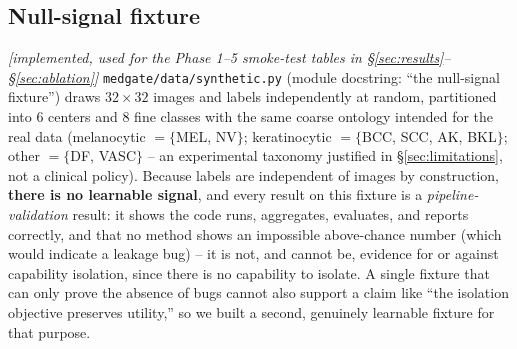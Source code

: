 \documentclass[11pt]{article}
\newcommand{\status}[1]{\textit{[#1]}}
\begin{document}
\subsection{Null-signal fixture} \status{implemented, used for the Phase 1--5
smoke-test tables in \S\ref{sec:results}--\S\ref{sec:ablation}}
\label{sec:synthetic-fixture}
\texttt{medgate/data/synthetic.py} (module docstring: ``the null-signal
fixture'') draws $32\times32$ images and labels independently at random,
partitioned into 6 centers and 8 fine classes with the same coarse ontology
intended for the real data (melanocytic $=\{$MEL, NV$\}$; keratinocytic
$=\{$BCC, SCC, AK, BKL$\}$; other $=\{$DF, VASC$\}$ -- an experimental
taxonomy justified in \S\ref{sec:limitations}, not a clinical policy).
Because labels are independent of images by construction, \textbf{there is
no learnable signal}, and every result on this fixture is a
\emph{pipeline-validation} result: it shows the code runs, aggregates,
evaluates, and reports correctly, and that no method shows an impossible
above-chance number (which would indicate a leakage bug) -- it is not, and
cannot be, evidence for or against capability isolation, since there is no
capability to isolate. A single fixture that can only prove the absence of
bugs cannot also support a claim like ``the isolation objective preserves
utility,'' so we built a second, genuinely learnable fixture for that
purpose.
\end{document}
